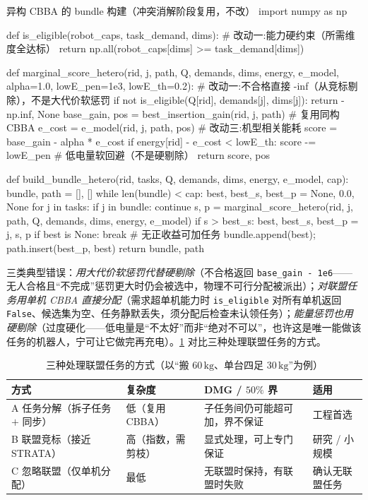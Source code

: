 \begin{codebox}[Python]{异构 CBBA 的 bundle 构建（冲突消解阶段复用，不改）}
import numpy as np

def is_eligible(robot_caps, task_demand, dims):      # 改动一:能力硬约束（所需维度全达标）
    return np.all(robot_caps[dims] >= task_demand[dims])

def marginal_score_hetero(rid, j, path, Q, demands, dims, energy, e_model,
                          alpha=1.0, lowE_pen=1e3, lowE_th=0.2):
    # 改动一:不合格直接 -inf（从竞标剔除），不是大代价软惩罚
    if not is_eligible(Q[rid], demands[j], dims[j]):
        return -np.inf, None
    base_gain, pos = best_insertion_gain(rid, j, path)     # 复用同构 CBBA
    e_cost = e_model(rid, j, path, pos)                    # 改动三:机型相关能耗
    score = base_gain - alpha * e_cost
    if energy[rid] - e_cost < lowE_th:
        score -= lowE_pen                                 # 低电量软回避（不是硬剔除）
    return score, pos

def build_bundle_hetero(rid, tasks, Q, demands, dims, energy, e_model, cap):
    bundle, path = [], []
    while len(bundle) < cap:
        best, best_s, best_p = None, 0.0, None
        for j in tasks:
            if j in bundle: continue
            s, p = marginal_score_hetero(rid, j, path, Q, demands, dims, energy, e_model)
            if s > best_s: best, best_s, best_p = j, s, p
        if best is None: break                            # 无正收益可加任务
        bundle.append(best); path.insert(best_p, best)
    return bundle, path
\end{codebox}

\noindent 三类典型错误：\emph{用大代价软惩罚代替硬剔除}（不合格返回 \texttt{base\_gain - 1e6}——无人合格且“不完成”惩罚更大时仍会被选中，物理不可行分配被派出）；\emph{对联盟任务用单机 CBBA 直接分配}（需求超单机能力时 \texttt{is\_eligible} 对所有单机返回 \texttt{False}、候选集为空、任务静默丢失，须分配后检查未认领任务）；\emph{能量惩罚也用硬剔除}（过度硬化——低电量是“不太好”而非“绝对不可以”，也许这是唯一能做该任务的机器人，宁可让它做完再充电）。\cref{tab:hmr-coalition-methods} 对比三种处理联盟任务的方式。

\begin{table}[H]\centering\small
\caption{三种处理联盟任务的方式（以“搬 $60\,\mathrm{kg}$、单台四足 $30\,\mathrm{kg}$”为例）}
\label{tab:hmr-coalition-methods}
\begin{tabular}{llll}
\toprule
方式 & 复杂度 & DMG / $50\%$ 界 & 适用 \\
\midrule
A 任务分解（拆子任务 $+$ 同步） & 低（复用 CBBA） & 子任务间仍可能超可加，界不保证 & 工程首选 \\
B 联盟竞标（接近 STRATA） & 高（指数，需剪枝） & 显式处理，可上专门保证 & 研究 / 小规模 \\
C 忽略联盟（仅单机分配） & 最低 & 无联盟时保持，有联盟时失败 & 确认无联盟任务 \\
\bottomrule
\end{tabular}
\end{table}

